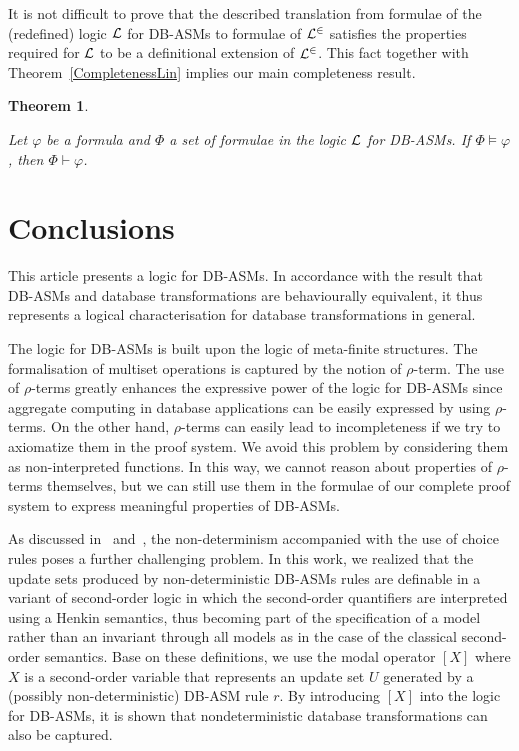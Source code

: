 \documentclass[preprint,11pt]{elsarticle}
\newtheorem{theorem}{Theorem}[section]
\theoremstyle{definition}
\theoremstyle{remark}
\begin{document}
It is not difficult to prove that the described translation from formulae of the (redefined) logic ${\cal L}$ for DB-ASMs to formulae of ${\cal L}^\in$ satisfies the properties required for ${\cal L}$ to be a definitional extension of ${\cal L}^\in$. This fact together with Theorem~\ref{CompletenessLin} implies our main completeness result.

\begin{theorem} \label{thm-adtm-completeness-FOL}

Let $\varphi$ be a formula and $\Phi$ a set of formulae in the logic ${\cal L}$
for DB-ASMs. If $\Phi\models\varphi$, then $\Phi\vdash\varphi$.

\end{theorem}
\fi

\section{Conclusions}\label{sec:conclusion}

This article presents a logic for DB-ASMs. In accordance with the
result that DB-ASMs and database transformations are behaviourally
equivalent, it thus represents a logical characterisation for
database transformations in general.

The logic for DB-ASMs is built upon the logic of
  meta-finite structures. The formalisation of
  multiset operations is captured by the notion of $\rho$-term.
The use of $\rho$-terms greatly enhances the
  expressive power of the logic for DB-ASMs since aggregate computing
  in database applications can be easily expressed by using $\rho$-terms.
On the other hand, $\rho$-terms can easily lead to incompleteness if we try to axiomatize them in the proof system. We avoid this problem by considering them as non-interpreted functions. In this way, we cannot reason about properties of $\rho$-terms themselves, but we can still use them in the formulae of our complete proof system to express meaningful properties of DB-ASMs.


As discussed in~\cite{RobertLogicASM} and~\cite{[BS03]}, the non-determinism accompanied with the use of
  choice rules poses a further challenging problem. In this work, we realized that the update sets produced by non-deterministic DB-ASMs rules are 
  definable in a variant of second-order logic in which the second-order quantifiers are interpreted using a Henkin semantics, thus becoming part of the specification of a model rather than an invariant through all models as in the case of the classical second-order semantics. 
Base on these definitions, we use the  modal operator $[X]$ where $X$ is a second-order variable that represents an update set $U$ generated by a
 (possibly non-deterministic) DB-ASM rule $r$. By introducing $[X]$ into the logic for DB-ASMs, it is shown that nondeterministic database
  transformations can also be captured.
\end{document}
